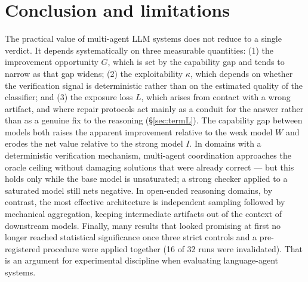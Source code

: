 \documentclass[11pt,a4paper]{article}
\begin{document}
\section{Conclusion and limitations}\label{sec:limits}

The practical value of multi-agent LLM systems does not reduce to a single verdict. It depends
systematically on three measurable quantities: (1) the improvement opportunity $G$, which is set by
the capability gap and tends to narrow as that gap widens; (2) the exploitability $\kappa$, which
depends on whether the verification signal is deterministic rather than on the estimated quality of
the classifier; and (3) the exposure loss $L$, which arises from contact with a wrong artifact, and
where repair protocols act mainly as a conduit for the answer rather than as a genuine fix to the
reasoning (\S\ref{sec:termL}). The capability gap between models both raises the apparent
improvement relative to the weak model $W$ and erodes the net value relative to the strong model
$I$. In domains with a deterministic verification mechanism, multi-agent coordination approaches
the oracle ceiling without damaging solutions that were already correct --- but this holds only
while the base model is unsaturated; a strong checker applied to a saturated model still nets
negative. In open-ended reasoning domains, by contrast, the most effective architecture is
independent sampling followed by mechanical aggregation, keeping intermediate artifacts out of the
context of downstream models. Finally, many results that looked promising at first no longer
reached statistical significance once three strict controls and a pre-registered procedure were
applied together (16 of 32 runs were invalidated). That is an argument for experimental discipline when evaluating language-agent
systems.
\end{document}
